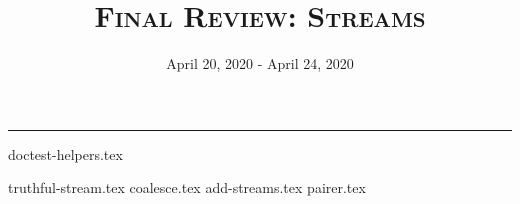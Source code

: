 \documentclass{exam}
\title{\textsc{Final Review: Streams}}
\date{April 20, 2020 - April 24, 2020}
\begin{document}
\maketitle\rule{\textwidth}{0.15em}
\fontsize{12}{15}\selectfont

{doctest-helpers.tex}
\newpage
\begin{questions}
{truthful-stream.tex}
\newpage
{coalesce.tex}
\newpage
{add-streams.tex}
\newpage
{pairer.tex}
\end{questions}
\end{document}
